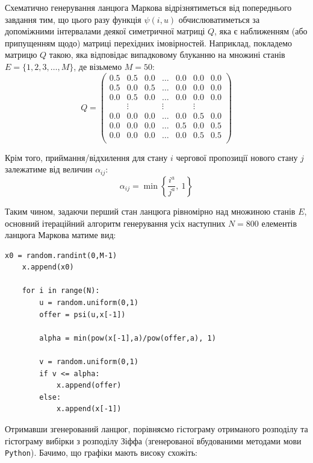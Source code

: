 \documentclass[a4paper,14pt]{extarticle} %
\numberwithin{equation}{section}
\begin{document}
Схематично генерування ланцюга Маркова відрізнятиметься від попереднього завдання тим, що цього разу функція $\psi(i,u)$ обчислюватиметься за допоміжними інтервалами деякої симетричної матриці $Q$, яка є наближенням (або припущенням щодо) матриці перехідних імовірностей. Наприклад, покладемо матрицю $Q$ такою, яка відповідає випадковому блуканню на множині станів $E=\{1,2,3,\ldots,M\}$, де візьмемо $M=50:$
\begin{equation*}
    Q = 
    \begin{pmatrix}
        0.5 & 0.5 & 0.0 & \ldots & 0.0 & 0.0 & 0.0 \\
        0.5 & 0.0 & 0.5 & \ldots & 0.0 & 0.0 & 0.0 \\
        0.0 & 0.5 & 0.0 & \ldots & 0.0 & 0.0 & 0.0 \\
        & \vdots & & \vdots & & \vdots & \\
        0.0 & 0.0 & 0.0 & \ldots & 0.0 & 0.5 & 0.0 \\
        0.0 & 0.0 & 0.0 & \ldots & 0.5 & 0.0 & 0.5 \\
        0.0 & 0.0 & 0.0 & \ldots & 0.0 & 0.5 & 0.5 \\
    \end{pmatrix}
\end{equation*}

Крім того, приймання/відхилення для стану $i$ чергової пропозиції нового стану $j$ залежатиме від величин $\alpha_{ij}:$
\[ \alpha_{ij}=\min\left\{\frac{i^a}{j^a},\ 1\right\} \] 

Таким чином, задаючи перший стан ланцюга рівномірно над множиною станів $E$, основний ітераційний алгоритм генерування усіх наступних $N=800$ елементів ланцюга Маркова матиме вид:

\begin{lstlisting}[firstnumber=1, label = code: task 2, caption = Генерування ланцюга Маркова]
    x0 = random.randint(0,M-1)
    x.append(x0)
    
    for i in range(N):
        u = random.uniform(0,1)
        offer = psi(u,x[-1])
    
        alpha = min(pow(x[-1],a)/pow(offer,a), 1)
    
        v = random.uniform(0,1)
        if v <= alpha:
            x.append(offer)
        else:
            x.append(x[-1])
\end{lstlisting}

Отримавши згенерований ланцюг, порівняємо гістограму отриманого розподілу та гістограму вибірки з розподілу Зіффа (згенерованої вбудованими методами мови \texttt{Python}). Бачимо, що графіки мають високу схожіть:
\end{document}
